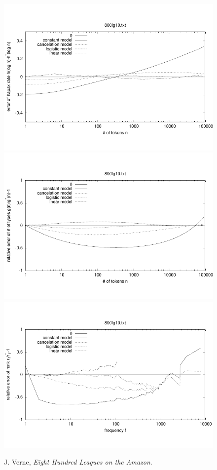 \documentclass[a4paper,12pt]{article}
\begin{document}
\begin{figure}[p]
  \centering
  \vspace{-2em}
  \includegraphics[width=0.8\columnwidth]{output/herdan/800lg10_27/token_ratio_residual.pdf}
  \\[-3em]
  \includegraphics[width=0.8\columnwidth]{output/herdan/800lg10_27/token_residual.pdf}
  \\[-3em]
  \includegraphics[width=0.8\columnwidth]{output/herdan/800lg10_27/frequency_residual.pdf}
  \vspace{-2em}
  \caption{J. Verne, \emph{Eight Hundred Leagues on the
      Amazon}.\label{fig800lg10R}}
\end{figure}
\end{document}
